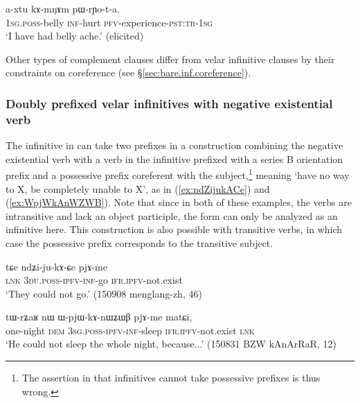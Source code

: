 \begin{exe} 
\ex \label{ex:kAmNAm.pWrYota}
\gll a-xtu kɤ-mŋɤm pɯ-rɲo-t-a. \\
\textsc{1sg}.\textsc{poss}-belly \textsc{inf}-hurt \textsc{pfv}-experience-\textsc{pst}:\textsc{tr}-\textsc{1sg} \\
\glt `I have had belly ache.' (elicited)
\end{exe} 

Other types of complement clauses differ from velar infinitive clauses by their constraints on coreference (see §\ref{sec:bare.inf.coreference}).

\subsubsection{Doubly prefixed velar infinitives with negative existential verb} \label{sec:inf.exist}
The infinitive in  can take two prefixes in a construction combining the negative existential verb  with a verb in the infinitive prefixed with a series B orientation prefix and a possessive prefix coreferent with the subject,\footnote{The assertion in \citet[228]{jacques16complementation} that infinitives cannot take possessive prefixes is thus wrong.} meaning `have no way to X, be completely unable to X', as in (\ref{ex:ndZijukACe}) and (\ref{ex:WpjWkAnWZWB}). Note that since in both of these examples, the verbs are intransitive and lack an object participle, the  form can only be analyzed as an infinitive here. This construction is also possible with transitive verbs, in which case the possessive prefix corresponds to the transitive subject.

\begin{exe}
\ex \label{ex:ndZijukACe}
\gll tɕe ndʑi-ju-kɤ-ɕe pjɤ-me \\
\textsc{lnk} \textsc{3du}.\textsc{poss}-\textsc{ipfv}-\textsc{inf}-go \textsc{ifr}.\textsc{ipfv}-not.exist \\
\glt `They could not go.' (150908 menglang-zh, 46)
\end{exe}

\begin{exe}
\ex \label{ex:WpjWkAnWZWB}
\gll tɯ-rʑaʁ nɯ ɯ-pjɯ-kɤ-nɯʑɯβ pjɤ-me matɕi, \\
one-night \textsc{dem} \textsc{3sg}.\textsc{poss}-\textsc{ipfv}-\textsc{inf}-sleep \textsc{ifr}.\textsc{ipfv}-not.exist \textsc{lnk} \\
\glt `He could not sleep the whole night, because...' (150831 BZW kAnArRaR, 12)
\end{exe}

